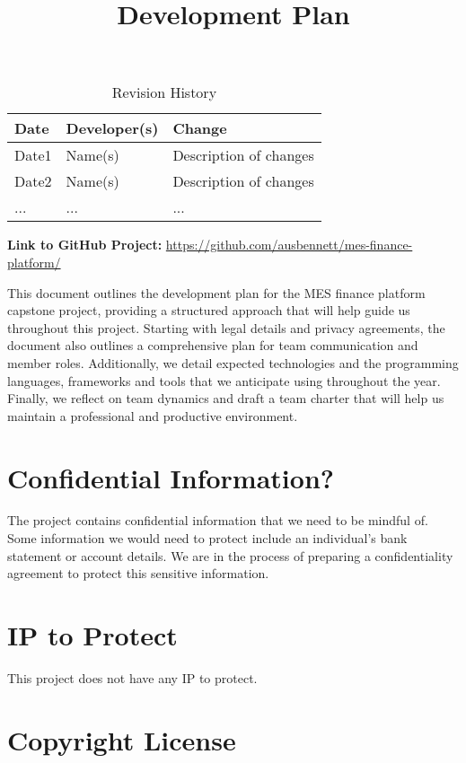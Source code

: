 \documentclass{article}
\title{Development Plan\\\progname}
\author{\authname}
\date{}
\begin{document}
\maketitle

\begin{table}[hp]
\caption{Revision History} \label{TblRevisionHistory}
\begin{tabularx}{\textwidth}{llX}
\toprule
\textbf{Date} & \textbf{Developer(s)} & \textbf{Change}\\
\midrule
Date1 & Name(s) & Description of changes\\
Date2 & Name(s) & Description of changes\\
... & ... & ...\\
\bottomrule
\end{tabularx}
\end{table}

\textbf{Link to GitHub Project:} \url{https://github.com/ausbennett/mes-finance-platform/}

\newpage{}


This document outlines the development plan for the MES finance platform capstone project, providing a structured approach that will help guide us throughout this project. Starting with legal details and privacy agreements, the document also outlines a comprehensive plan for team communication and member roles. Additionally, we detail expected technologies and the programming languages, frameworks and tools that we anticipate using throughout the year. Finally, we reflect on team dynamics and draft a team charter that will help us maintain a professional and productive environment.

\section{Confidential Information?}

The project contains confidential information that we need to be mindful of. Some information we would need to protect include an individual's bank statement or account details. We are in the process of preparing a confidentiality agreement to protect this sensitive information.

\section{IP to Protect}

This project does not have any IP to protect. 

\section{Copyright License}
\end{document}
